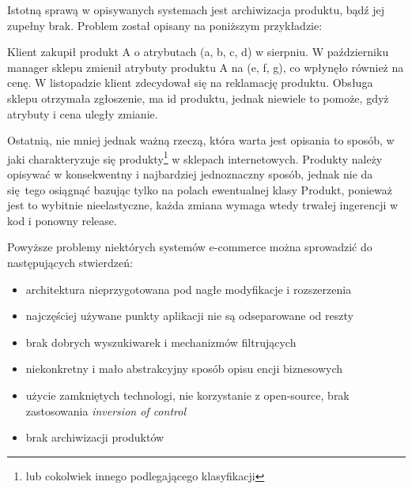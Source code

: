 Istotną sprawą w opisywanych systemach jest archiwizacja produktu, bądź jej zupełny brak. Problem został opisany na poniższym przykładzie:
\begin{example}
	Klient zakupił produkt A o atrybutach (a, b, c, d) w sierpniu. W październiku manager sklepu zmienił atrybuty produktu A na (e, f, g), co wpłynęło również na cenę. W listopadzie klient zdecydował się na reklamację produktu. Obsługa sklepu otrzymała zgłoszenie, ma id produktu, jednak niewiele to pomoże, gdyż atrybuty i cena uległy zmianie. 
\end{example}

Ostatnią, nie mniej jednak ważną rzeczą, która warta jest opisania to sposób, w jaki charakteryzuje się produkty\footnote{ lub cokolwiek innego podlegającego klasyfikacji} w sklepach internetowych. Produkty należy opisywać w konsekwentny i najbardziej jednoznaczny sposób, jednak nie da się tego osiągnąć bazując tylko na polach ewentualnej klasy Produkt, ponieważ jest to wybitnie nieelastyczne, każda zmiana wymaga wtedy trwałej ingerencji w kod i ponowny release.

Powyższe problemy niektórych systemów e-commerce można sprowadzić do następujących stwierdzeń:
\begin{itemize}
	\item architektura nieprzygotowana pod nagłe modyfikacje i rozszerzenia
	\item najczęściej używane punkty aplikacji nie są odseparowane od reszty
	\item brak dobrych wyszukiwarek i mechanizmów filtrujących
	\item niekonkretny i mało abstrakcyjny sposób opisu encji biznesowych
	\item użycie zamkniętych technologi, nie korzystanie z open-source, brak zastosowania \textit{inversion of control}
	\item brak archiwizacji produktów
\end{itemize}

